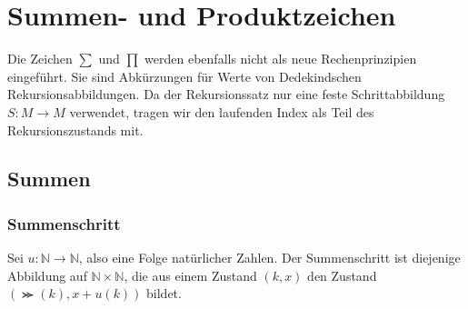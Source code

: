 \documentclass[main.tex]{subfiles}
\begin{document}
\section{Summen- und Produktzeichen}

Die Zeichen \(\sum\) und \(\prod\) werden ebenfalls nicht als neue
Rechenprinzipien eingeführt. Sie sind Abkürzungen für Werte von
Dedekindschen Rekursionsabbildungen. Da der Rekursionssatz nur eine feste
Schrittabbildung \(S\colon M\to M\) verwendet, tragen wir den laufenden Index
als Teil des Rekursionszustands mit.

\subsection{Summen}

\subsubsection{Summenschritt}

Sei \(u\colon\mathbb{N}\to\mathbb{N}\), also eine Folge natürlicher Zahlen.
Der Summenschritt ist diejenige Abbildung auf
\(\mathbb{N}\times\mathbb{N}\), die aus einem Zustand \((k,x)\) den Zustand
\((\Succ(k),x + u(k))\) bildet.


\begin{tabproof}
\end{tabproof}
\end{document}
